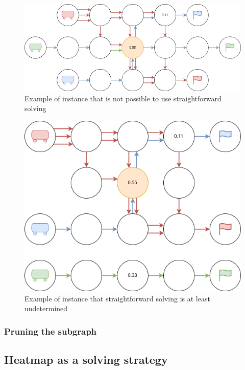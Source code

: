 \begin{figure}[H]
  \centering
  \caption{Example of instance that is not possible to use straightforward solving}\label{img:heatmap_sf_solving}
  \includegraphics[width=\widthimg]{img/heatmap_sf_solving.drawio.png}
\end{figure}

\begin{figure}[H]
  \centering
  \caption{Example of instance that straightforward solving is at least undetermined}\label{img:heatmap_sf_solving_possible}
  \includegraphics[width=\widthimg]{img/heatmap_sf_solving_possible.drawio.png}
\end{figure}


\subsubsection{Pruning the subgraph}


\subsection{Heatmap as a solving strategy}


